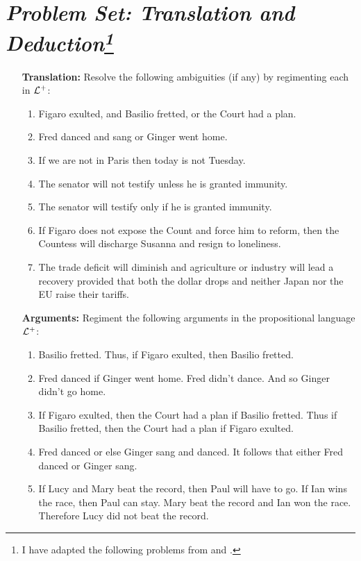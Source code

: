 \documentclass[a4paper, 11pt]{article} %
\begin{document}
\section*{\it Problem Set: Translation and Deduction\footnote{I have adapted the following problems from \citet{Goldfarb2003} and \citet{Laboreo2005}.}}

\begin{enumerate}[leftmargin=1.2in,labelsep=.15in] 
\item[\bf Translation:] Resolve the following ambiguities (if any) by regimenting each in $\mathcal{L}^+$:
	\begin{enumerate}[label=\arabic*.]\small
	\item Figaro exulted, and Basilio fretted, or the Court had a plan.
	\item Fred danced and sang or Ginger went home.
	\item If we are not in Paris then today is not Tuesday.
	\item The senator will not testify unless he is granted immunity.
	\item The senator will testify only if he is granted immunity.
	\item If Figaro does not expose the Count and force him to reform, then the Countess will discharge Susanna and resign to loneliness.
	\item The trade deficit will diminish and agriculture or industry will lead a recovery provided that both the dollar drops and neither Japan nor the EU raise their tariffs.
	\end{enumerate}
\item[\bf Arguments:] Regiment the following arguments in the propositional language $\mathcal{L}^+$:
	\begin{enumerate}[label=\arabic*.]\small
	\item Basilio fretted. Thus, if Figaro exulted, then Basilio fretted.
	\item Fred danced if Ginger went home. Fred didn't dance. And so Ginger didn't go home.
	\item If Figaro exulted, then the Court had a plan if Basilio fretted. Thus if Basilio fretted, then the Court had a plan if Figaro exulted.
	\item Fred danced or else Ginger sang and danced. It follows that either Fred danced or Ginger sang.
	\item If Lucy and Mary beat the record, then Paul will have to go. If Ian wins the race, then Paul can stay. Mary beat the record and Ian won the race. Therefore Lucy did not beat the record.

\end{enumerate}
\end{enumerate}
\end{document}
